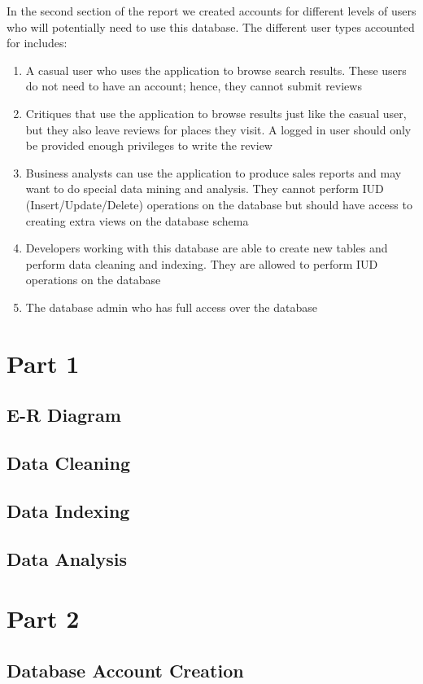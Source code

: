 \documentclass[12pt]{scrbook}
\begin{document}
In the second section of the report we created accounts for different levels of users who will
potentially need to use this database. The different user types accounted for includes:
\begin{enumerate}
  \item{A casual user who uses the application to browse search results. These users do not need
	to have an account; hence, they cannot submit reviews}
  \item{Critiques that use the application to browse results just like the casual user, but they also
	leave reviews for places they visit. A logged in user should only be provided enough privileges
	to write the review}
  \item{Business analysts can use the application to produce sales reports and may want to do
	special data mining and analysis. They cannot perform IUD (Insert/Update/Delete) operations
	on the database but should have access to creating extra views on the database
	schema}
  \item{Developers working with this database are able to create new tables and perform data
	cleaning and indexing. They are allowed to perform IUD operations on the database}
  \item{The database admin who has full access over the database}
\end{enumerate}

\section{Part 1}
\subsection{E-R Diagram}

\subsection{Data Cleaning}

\subsection{Data Indexing}

\subsection{Data Analysis}

\section{Part 2}
\subsection{Database Account Creation}
\end{document}
